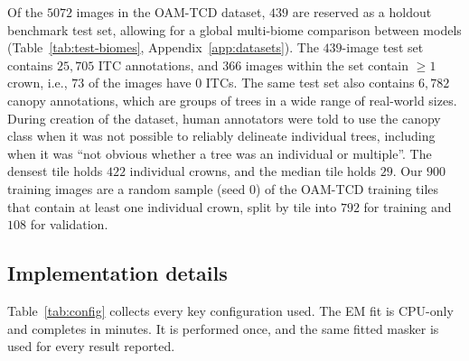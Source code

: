 \documentclass[remotesensing,article,submit,moreauthors]{Definitions/mdpi}
\begin{document}
Of the $5072$ images in the OAM-TCD dataset, $439$ are reserved as a holdout benchmark test set, allowing for a global multi-biome comparison between models (Table~\ref{tab:test-biomes}, Appendix~\ref{app:datasets}). The $439$-image test set contains $25{,}705$ ITC annotations, and $366$ images within the set contain $\geq 1$ crown, i.e., $73$ of the images have $0$ ITCs. The same test set also contains $6{,}782$ canopy annotations, which are groups of trees in a wide range of real-world sizes. During creation of the dataset, human annotators were told to use the canopy class when it was not possible to reliably delineate individual trees, including when it was ``not obvious whether a tree was an individual or multiple''. The densest tile holds $422$ individual crowns, and the median tile holds $29$. Our $900$ training images are a random sample (seed $0$) of the OAM-TCD training tiles that contain at least one individual crown, split by tile into $792$ for training and $108$ for validation.


\subsection{Implementation details}
\label{sec:implementation}

Table~\ref{tab:config} collects every key configuration used. The EM fit is CPU-only and completes in minutes. It is performed once, and the same fitted masker is used for every result reported.
\end{document}
